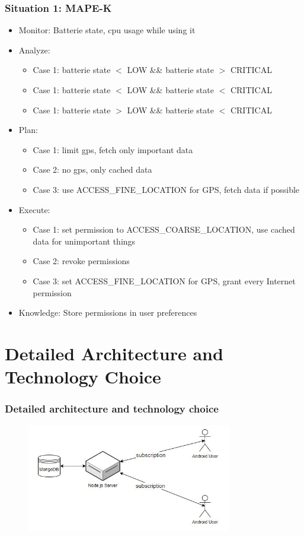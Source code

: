\documentclass[aspectratio=169]{beamer}
\begin{document}
\begin{frame}   
	\frametitle{Situation 1: MAPE-K}
	\begin{itemize}
		\item Monitor: Batterie state, cpu usage while using it
		\item Analyze: 
			 \begin{itemize} 
				\item Case 1: batterie state $<$ LOW \&\& batterie state $>$ CRITICAL
				\item Case 1: batterie state $<$ LOW \&\& batterie state $<$ CRITICAL
				\item Case 1: batterie state $>$ LOW \&\& batterie state $<$ CRITICAL
			\end{itemize}
		\item Plan:
			\begin{itemize}
				\item Case 1: limit gps, fetch only important data 
				\item Case 2: no gps, only cached data
				\item Case 3: use ACCESS\_FINE\_LOCATION for GPS, fetch data if possible
			\end{itemize}
		\item Execute:
			\begin{itemize}
				\item Case 1: set permission to ACCESS\_COARSE\_LOCATION, use cached data for unimportant things
    				\item Case 2: revoke permissions
    				\item Case 3: set ACCESS\_FINE\_LOCATION for GPS, grant every Internet permission
			\end{itemize}
		\item Knowledge: Store permissions in user preferences
	\end{itemize}
\end{frame}





\section{Detailed Architecture and Technology Choice}
\begin{frame}
	\frametitle{Detailed architecture and technology choice}
	 \begin{figure}
		\centering
		\includegraphics[width=0.8\textwidth]{media/architecture.jpg}
	\end{figure}
\end{frame}
\end{document}
